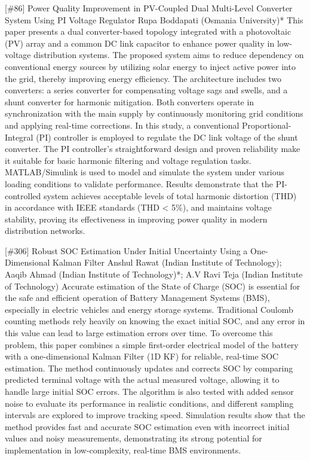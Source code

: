 {} \begin{abstract_online} {[\#86] Power Quality Improvement in PV-Coupled Dual Multi-Level Converter System Using PI Voltage Regulator} {} {Rupa Boddapati (Osmania University)*} {} This paper presents a dual converter-based topology integrated with a photovoltaic (PV) array and a common DC link capacitor to enhance power quality in low-voltage distribution systems. The proposed system aims to reduce dependency on conventional energy sources by utilizing solar energy to inject active power into the grid, thereby improving energy efficiency. The architecture includes two converters: a series converter for compensating voltage sags and swells, and a shunt converter for harmonic mitigation. Both converters operate in synchronization with the main supply by continuously monitoring grid conditions and applying real-time corrections. In this study, a conventional Proportional-Integral (PI) controller is employed to regulate the DC link voltage of the shunt converter. The PI controller's straightforward design and proven reliability make it suitable for basic harmonic filtering and voltage regulation tasks. MATLAB/Simulink is used to model and simulate the system under various loading conditions to validate performance. Results demonstrate that the PI-controlled system achieves acceptable levels of total harmonic distortion (THD) in accordance with IEEE standards (THD < 5\%), and maintains voltage stability, proving its effectiveness in improving power quality in modern distribution networks. \end{abstract_online} 
{} \begin{abstract_online} {[\#306] Robust SOC Estimation Under Initial Uncertainty Using a One-Dimensional Kalman Filter} {} {Anshul Rawat (Indian Institute of Technology); Aaqib Ahmad (Indian Institute of Technology)*; A.V Ravi Teja (Indian Institute of Technology)} {} Accurate estimation of the State of Charge (SOC) is essential for the safe and efficient operation of Battery Management Systems (BMS), especially in electric vehicles and energy storage systems. Traditional Coulomb counting methods rely heavily on knowing the exact initial SOC, and any error in this value can lead to large estimation errors over time. To overcome this problem, this paper combines a simple first-order electrical model of the battery with a one-dimensional Kalman Filter (1D KF) for reliable, real-time SOC estimation. The method continuously updates and corrects SOC by comparing predicted terminal voltage with the actual measured voltage, allowing it to handle large initial SOC errors. The algorithm is also tested with added sensor noise to evaluate its performance in realistic conditions, and different sampling intervals are explored to improve tracking speed. Simulation results show that the method provides fast and accurate SOC estimation even with incorrect initial values and noisy measurements, demonstrating its strong potential for implementation in low-complexity, real-time BMS environments. \end{abstract_online} 
